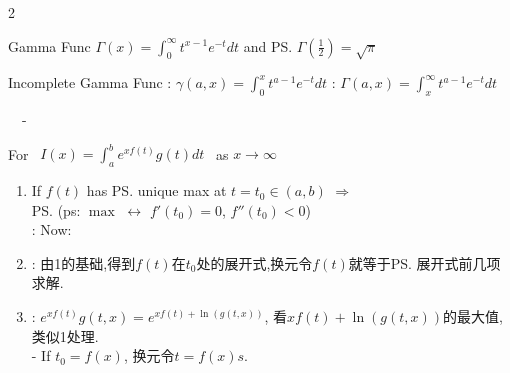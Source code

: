 \documentclass{note}
\begin{document}
\begin{multicols}{2}
{{    \vspace{-3pt}
    \begin{MyTh}{Gamma Func}
        \tiny $\Gamma(x)=\int_{0}^{\infty}t^{x-1}e^{-t}dt$ \quad {} and  \quad \ps{$\Gamma(\frac{1}{2})=\sqrt{\pi}$}
    \end{MyTh}

    \begin{MyTh}{Incomplete Gamma Func}
        {\tiny {}: $\gamma(a,x)=\int_0^{x}t^{a-1}e^{-t}dt$ \quad {}: $\Gamma(a,x)=\int_x^{\infty}t^{a-1}e^{-t}dt$}

        \vspace{-2pt}
        \ \ -  
    \end{MyTh}

    \vspace{-4pt}
    \begin{MyTh}{}\tiny For \ $I(x)=\int_{a}^{b}e^{xf(t)}g(t)dt$ \ as $x\to\infty$

        \vspace{-8pt}
        \begin{enumerate}
            \item If $f(t)$ has \ps{unique max} at $t=t_0\in(a,b)$ $\Rightarrow$  \\
             \quad \ps{(ps: $\max$ $\leftrightarrow$ $f'(t_0)=0$, $f''(t_0)<0$)} \\
            : Now:  \\
            \item {}: 由1的基础,得到$f(t)$在$t_0$处的展开式,换元令$f(t)$就等于\ps{展开式前几项求解}.
            \item {}: $e^{xf(t)}g(t,x)=e^{xf(t)+\ln(g(t,x))}$, 看$xf(t)+\ln(g(t,x))$的最大值,类似1处理. \\
            - If $t_0=f(x)$, 换元令$t=f(x)s$.
        \end{enumerate}
    \end{MyTh}

}}
\end{multicols}
\end{document}
